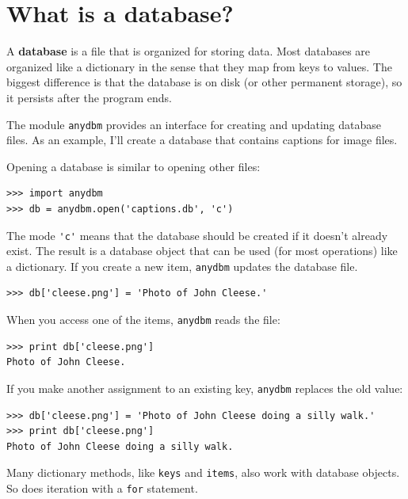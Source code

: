 \documentclass[10pt]{book}
\begin{document}
\section{What is a database?}

A {\bf database} is a file that is organized for storing data.
Most databases are organized like a dictionary in the sense
that they map from keys to values.  The biggest difference
is that the database is on disk (or other permanent storage),
so it persists after the program ends.


The module {\tt anydbm} provides an interface for creating
and updating database files.  As an example, I'll create a database
that contains captions for image files.


Opening a database is similar
to opening other files:

\beforeverb
\begin{verbatim}
>>> import anydbm
>>> db = anydbm.open('captions.db', 'c')
\end{verbatim}
\afterverb
%
The mode \verb"'c'" means that the database should be created if
it doesn't already exist.  The result is a database object
that can be used (for most operations) like a dictionary.
If you create a new item, {\tt anydbm} updates the database file.



\beforeverb
\begin{verbatim}
>>> db['cleese.png'] = 'Photo of John Cleese.'
\end{verbatim}
\afterverb
%
When you access one of the items, {\tt anydbm} reads the file:

\beforeverb
\begin{verbatim}
>>> print db['cleese.png']
Photo of John Cleese.
\end{verbatim}
\afterverb
%
If you make another assignment to an existing key, {\tt anydbm} replaces
the old value:

\beforeverb
\begin{verbatim}
>>> db['cleese.png'] = 'Photo of John Cleese doing a silly walk.'
>>> print db['cleese.png']
Photo of John Cleese doing a silly walk.
\end{verbatim}
\afterverb
%
Many dictionary methods, like {\tt keys} and {\tt items}, also
work with database objects.  So does iteration with a {\tt for}
statement.
\end{document}
